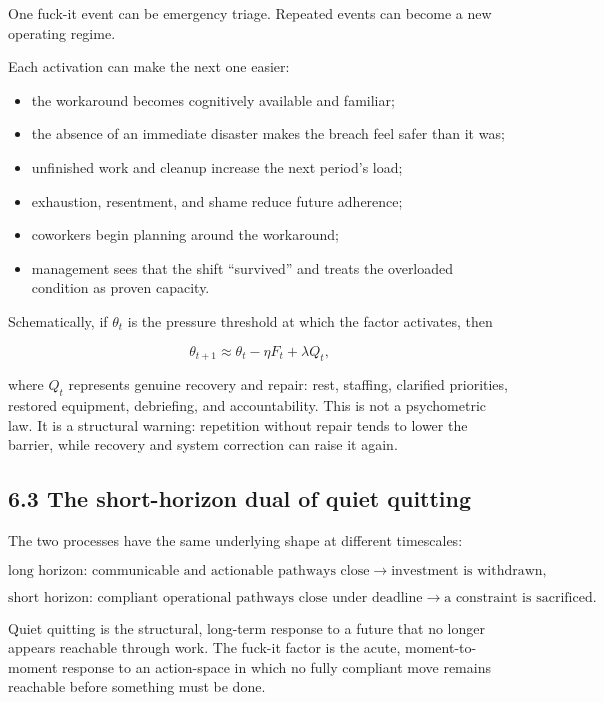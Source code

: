 \documentclass[11pt,oneside]{article}
\providecommand{\tightlist}{%
  \setlength{\itemsep}{0.22em}\setlength{\parskip}{0pt}}
\begin{document}
One fuck-it event can be emergency triage. Repeated events can become a
new operating regime.

Each activation can make the next one easier:

\begin{itemize}
\tightlist
\item
  the workaround becomes cognitively available and familiar;
\item
  the absence of an immediate disaster makes the breach feel safer than
  it was;
\item
  unfinished work and cleanup increase the next period's load;
\item
  exhaustion, resentment, and shame reduce future adherence;
\item
  coworkers begin planning around the workaround;
\item
  management sees that the shift ``survived'' and treats the overloaded
  condition as proven capacity.
\end{itemize}

Schematically, if \(\theta_t\) is the pressure threshold at which the
factor activates, then

\[
\theta_{t+1}
\approx
\theta_t - \eta F_t + \lambda Q_t,
\]

where \(Q_t\) represents genuine recovery and repair: rest, staffing,
clarified priorities, restored equipment, debriefing, and
accountability. This is not a psychometric law. It is a structural
warning: repetition without repair tends to lower the barrier, while
recovery and system correction can raise it again.

\subsection{6.3 The short-horizon dual of quiet
quitting}\label{the-short-horizon-dual-of-quiet-quitting}

The two processes have the same underlying shape at different
timescales:

\[
\text{long horizon: communicable and actionable pathways close}
\longrightarrow
\text{investment is withdrawn},
\]

\[
\text{short horizon: compliant operational pathways close under deadline}
\longrightarrow
\text{a constraint is sacrificed}.
\]

Quiet quitting is the structural, long-term response to a future that no
longer appears reachable through work. The fuck-it factor is the acute,
moment-to-moment response to an action-space in which no fully compliant
move remains reachable before something must be done.
\end{document}
